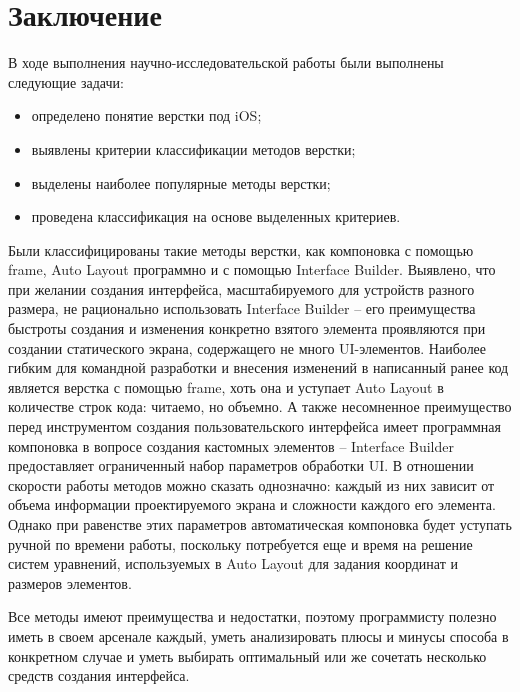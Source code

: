 \chapter*{Заключение}

В ходе выполнения научно-исследовательской работы были выполнены следующие задачи: 

\begin{itemize}
	\item определено понятие верстки под iOS;
	\item выявлены критерии классификации методов верстки;
	\item выделены наиболее популярные методы верстки;
	\item проведена классификация на основе выделенных критериев.	
\end{itemize}

Были классифицированы такие методы верстки, как компоновка с помощью frame, Auto Layout программно и с помощью Interface Builder. Выявлено, что при желании создания интерфейса, масштабируемого для устройств разного размера, не рационально использовать Interface Builder -- его преимущества быстроты создания и изменения конкретно взятого элемента проявляются при создании статического экрана, содержащего не много UI-элементов. Наиболее гибким для командной разработки и внесения изменений в написанный ранее код является верстка с помощью frame, хоть она и уступает Auto Layout в количестве строк кода: читаемо, но объемно. А также несомненное преимущество перед инструментом создания пользовательского интерфейса имеет программная компоновка в вопросе создания кастомных элементов -- Interface Builder предоставляет ограниченный набор параметров обработки UI. В отношении скорости работы методов можно сказать однозначно: каждый из них зависит от объема информации проектируемого экрана и сложности каждого его элемента. Однако при равенстве этих параметров автоматическая компоновка будет уступать ручной по времени работы, поскольку потребуется еще и время на решение систем уравнений, используемых в Auto Layout для задания координат и размеров элементов. 

Все методы имеют преимущества и недостатки, поэтому программисту полезно иметь в своем арсенале каждый, уметь анализировать плюсы и минусы способа в конкретном случае и уметь выбирать оптимальный или же сочетать несколько средств создания интерфейса. 
